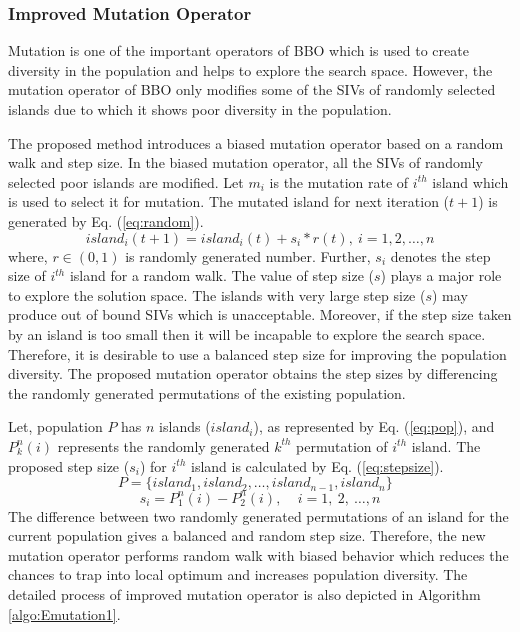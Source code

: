 \subsubsection{Improved Mutation Operator}\label{sec: BMuO}

Mutation is one of the important operators of BBO which is used to create diversity in the population and helps to explore the search space. However, the mutation operator of BBO only modifies some of the SIVs of randomly selected islands due to which it shows poor diversity in the population. 

The proposed method introduces a biased mutation operator based on a random walk and step size. In the biased mutation operator, all the SIVs of randomly selected poor islands are modified. Let $m_i$ is the mutation rate of $i^{th}$ island which is used to select it for mutation. The mutated island for next iteration ($t+1$) is generated by Eq. (\ref{eq:random}).
\begin{equation}\label{eq:random}
island_i(t+1)=island_i(t)+ s_i*r(t), \ i=1, 2,\dots,n
\end{equation}
where, $r \in (0,1)$ is  randomly generated number. Further, $s_i$ denotes the step size of $i^{th}$ island for a random walk. The value of step size ($s$) plays a major role to explore the solution space. The islands with very large step size ($s$) may produce out of bound SIVs which is unacceptable. Moreover, if the step size taken by an island is too small then it will be incapable to explore the search space. Therefore, it is desirable to use a balanced step size for improving the population diversity. The proposed mutation operator obtains the step sizes by differencing the randomly generated permutations of the existing population. 

Let, population $P$ has $n$ islands ($island_i$), as represented by  Eq. (\ref{eq:pop}), and $P^n_k(i)$ represents the randomly generated $k^{th}$ permutation of $i^{th}$ island. The proposed  step size ($s_i$) for  $i^{th}$ island is calculated by Eq. (\ref{eq:stepsize}).
\begin{equation}\label{eq:pop}
P  = \{island_1, island_2, \dots , island_{n-1}, island_n\} \ \ \ 
\end{equation}
\begin{equation}\label{eq:stepsize}
    s_i= P^n_1(i)- P^n_2(i), \ \ \ \ \ i=1,\ 2,\ \dots,n
\end{equation}
The difference between two randomly generated permutations of an island for the current population gives a balanced and random step size. Therefore, the new mutation operator performs random walk with biased behavior which reduces the chances to trap into local optimum and increases population diversity. The detailed process of improved mutation operator is also depicted in Algorithm \ref{algo:Emutation1}.

